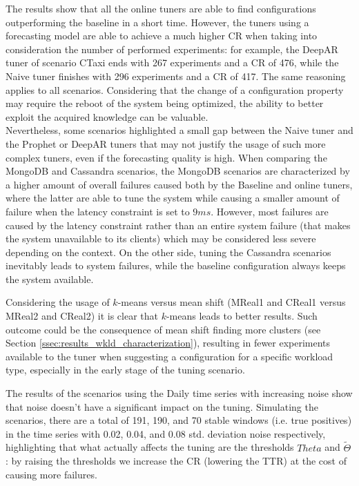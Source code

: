 \documentclass[a4paper, 12pt]{article} %
\begin{document}
	The results show that all the online tuners are able to find configurations outperforming the baseline in a short time. However, the tuners using a forecasting model are able to achieve a much higher CR when taking into consideration the number of performed experiments: for example, the DeepAR tuner of scenario CTaxi ends with 267 experiments and a CR of 476, while the Naive tuner finishes with 296 experiments and a CR of 417. The same reasoning applies to all scenarios. Considering that the change of a configuration property may require the reboot of the system being optimized, the ability to better exploit the acquired knowledge can be valuable. \\
	Nevertheless, some scenarios highlighted a small gap between the Naive tuner and the Prophet or DeepAR tuners that may not justify the usage of such more complex tuners, even if the forecasting quality is high.
	When comparing the MongoDB and Cassandra scenarios, the MongoDB scenarios are characterized by a higher amount of overall failures caused both by the Baseline and online tuners, where the latter are able to tune the system while causing a smaller amount of failure when the latency constraint is set to $9ms$. However, most failures are caused by the latency constraint rather than an entire system failure (that makes the system unavailable to its clients) which may be considered less severe depending on the context. On the other side, tuning the Cassandra scenarios inevitably leads to system failures, while the baseline configuration always keeps the system available. 
	
	Considering the usage of $k$-means versus mean shift (MReal1 and CReal1 versus MReal2 and CReal2) it is clear that $k$-means leads to better results. Such outcome could be the consequence of mean shift finding more clusters (see Section \ref{ssec:results_wkld_characterization}), resulting in fewer experiments available to the tuner when suggesting a configuration for a specific workload type, especially in the early stage of the tuning scenario. 
	
	The results of the scenarios using the Daily time series with increasing noise show that noise doesn't have a significant impact on the tuning. Simulating the scenarios, there are a total of 191, 190, and 70 stable windows (i.e. true positives) in the time series with 0.02, 0.04, and 0.08 std. deviation noise respectively, highlighting that what actually affects the tuning are the thresholds $Theta$ and $\tilde{\Theta}$: by raising the thresholds we increase the CR (lowering the TTR) at the cost of causing more failures. 
\end{document}
